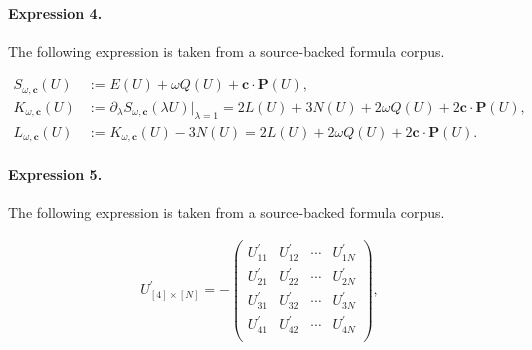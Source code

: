 \documentclass[11pt]{article}
\begin{document}
\paragraph{Expression 4.} The following expression is taken from a source-backed formula corpus.

\begin{align*}S_{\omega,\mathbf{c}}(U)&:=E(U)+\omega Q(U)+\mathbf{c}\cdot \mathbf{P}(U),\\K_{\omega,\mathbf{c}}(U)&:=\partial_{\lambda}S_{\omega,\mathbf{c}}(\lambda U)|_{\lambda =1}=2L(U)+3N(U)+2\omega Q(U)+2 \mathbf{c}\cdot \mathbf{P}(U),\\L_{\omega,\mathbf{c}}(U)&:=K_{\omega, \mathbf{c}}(U)-3N(U)=2L(U)+2\omega Q(U)+2\mathbf{c}\cdot \mathbf{P}(U).\end{align*}

\paragraph{Expression 5.} The following expression is taken from a source-backed formula corpus.

\begin{align*}U^{\prime}_{[4]\times[N]} = - \left( \! \begin{array}{cccc} U^{\prime}_{11} & U^{\prime}_{12} & \cdots & U^{\prime}_{1N} \\U^{\prime}_{21} & U^{\prime}_{22} & \cdots & U^{\prime}_{2N} \\U^{\prime}_{31} & U^{\prime}_{32} & \cdots & U^{\prime}_{3N} \\U^{\prime}_{41} & U^{\prime}_{42} & \cdots & U^{\prime}_{4N} \\\end{array} \! \right),\end{align*}
\end{document}
